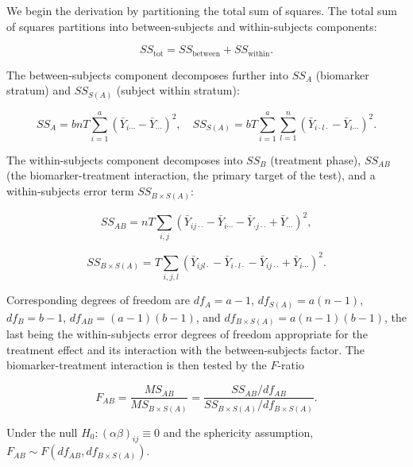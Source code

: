 \documentclass[
  11pt,
]{article}
\begin{document}
We begin the derivation by partitioning the total sum of squares.
The total sum of squares partitions into between-subjects and
within-subjects components:

\begin{equation}
SS_{\text{tot}} = SS_{\text{between}} + SS_{\text{within}} .
\label{eq:rmanova-ss-partition}
\end{equation}

The between-subjects component decomposes further into \(SS_A\)
(biomarker stratum) and \(SS_{S(A)}\) (subject within stratum):

\begin{equation}
SS_A = bnT \sum_{i=1}^a (\bar Y_{i\cdots} - \bar Y_{\cdots})^2,
\quad
SS_{S(A)} = bT \sum_{i=1}^a \sum_{l=1}^n
(\bar Y_{i\cdot l\cdot} - \bar Y_{i\cdots})^2 .
\label{eq:rmanova-between}
\end{equation}

The within-subjects component decomposes into \(SS_B\) (treatment
phase), \(SS_{AB}\) (the biomarker-treatment interaction, the
primary target of the test), and a within-subjects error term
\(SS_{B \times S(A)}\):

\begin{equation}
SS_{AB} = nT \sum_{i,j} (\bar Y_{ij\cdot\cdot}
- \bar Y_{i\cdots} - \bar Y_{\cdot j\cdot\cdot}
+ \bar Y_{\cdots})^2 ,
\label{eq:rmanova-ss-ab}
\end{equation}

\begin{equation}
SS_{B \times S(A)} = T \sum_{i,j,l} (\bar Y_{ijl\cdot}
- \bar Y_{i\cdot l\cdot} - \bar Y_{ij\cdot\cdot}
+ \bar Y_{i\cdots})^2 .
\label{eq:rmanova-ss-error}
\end{equation}

Corresponding degrees of freedom are \(df_A = a - 1\),
\(df_{S(A)} = a(n-1)\), \(df_B = b - 1\), \(df_{AB} = (a-1)(b-1)\),
and \(df_{B \times S(A)} = a(n-1)(b-1)\), the last being the
within-subjects error degrees of freedom appropriate for the
treatment effect and its interaction with the between-subjects
factor. The biomarker-treatment interaction is then tested by the
\(F\)-ratio

\begin{equation}
F_{AB} = \frac{MS_{AB}}{MS_{B \times S(A)}}
= \frac{SS_{AB} / df_{AB}}
       {SS_{B \times S(A)} / df_{B \times S(A)}} .
\label{eq:rmanova-f}
\end{equation}

Under the null \(H_0: (\alpha\beta)_{ij} \equiv 0\) and the
sphericity assumption, \(F_{AB} \sim F(df_{AB}, df_{B \times
S(A)})\).
\end{document}
